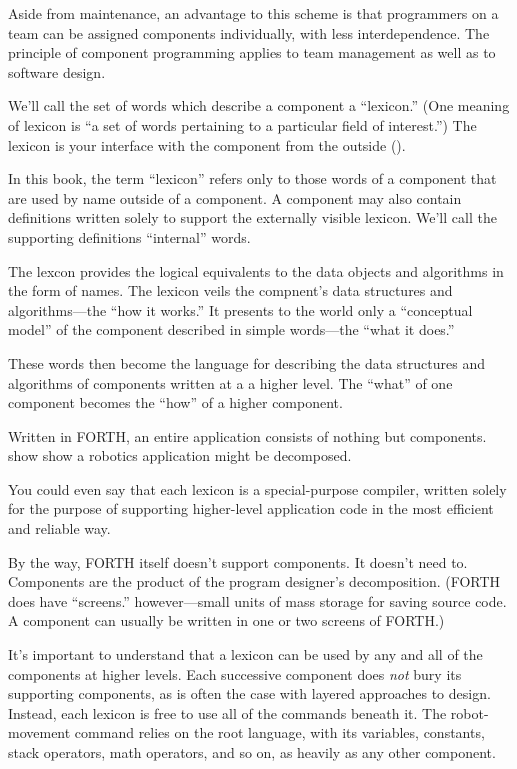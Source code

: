 Aside from maintenance, an advantage to this scheme is that programmers
on a team can be assigned components individually, with less interdependence.
The principle of component programming applies to team management
as well as to software design.


We'll call the set of words which describe a component a {}``lexicon.''
(One meaning of lexicon is {}``a set of words pertaining to a particular
field of interest.'') The lexicon is your interface with the component
from the outside ().

In this book, the term {}``lexicon'' refers only to those words
of a component that are used by name outside of a component. A component
may also contain definitions written solely to support the externally
visible lexicon. We'll call the supporting definitions {}``internal''
words.


The lexcon provides the logical equivalents to the data objects and
algorithms in the form of names. The lexicon veils the compnent's
data structures and algorithms---the {}``how it works.'' It presents
to the world only a {}``conceptual model'' of the component described
in simple words---the {}``what it does.''

These words then become the language for describing the data structures
and algorithms of components written at a a higher level. The {}``what''
of one component becomes the {}``how'' of a higher component.


Written in FORTH, an entire application consists of nothing but components.
 show show a robotics application might be decomposed.

You could even say that each lexicon is a special-purpose compiler,
written solely for the purpose of supporting higher-level application
code in the most efficient and reliable way.

By the way, FORTH itself doesn't support components. It doesn't need
to. Components are the product of the program designer's decomposition.
(FORTH does have {}``screens.'' however---small units of mass storage
for saving source code. A component can usually be written in one
or two screens of FORTH.)

It's important to understand that a lexicon can be used by any and
all of the components at higher levels. Each successive component
does \emph{not} bury its supporting components, as is often the case
with layered approaches to design. Instead, each lexicon is free to
use all of the commands beneath it. The robot-movement command relies
on the root language, with its variables, constants, stack operators,
math operators, and so on, as heavily as any other component.

